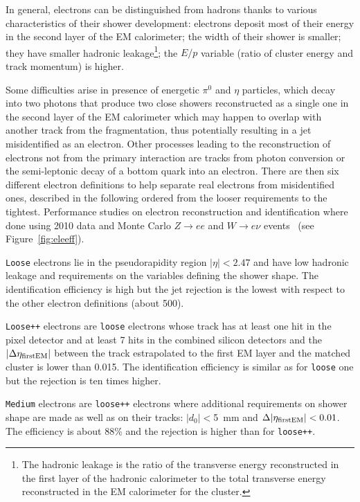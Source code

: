 In general, electrons can be distinguished from hadrons thanks to various characteristics
of their shower development: electrons deposit most of their energy in the second layer of
the EM calorimeter; the width of their shower is smaller; they have smaller
hadronic leakage\footnote{The hadronic leakage is the ratio of the transverse energy reconstructed
in the first layer of the hadronic calorimeter to the total  transverse energy reconstructed in the 
EM calorimeter for the cluster.}; the $E/p$ variable (ratio of cluster energy and track momentum) is higher.

Some difficulties arise in presence of energetic
$\pi^0$ and $\eta$ particles, 
which decay into two photons that produce two close 
showers reconstructed as a single one in the second layer of the EM
calorimeter which may happen to overlap with another track from the fragmentation, 
thus potentially resulting in a jet misidentified as an electron.
Other processes leading to the reconstruction of electrons 
not from the primary interaction are tracks from photon conversion
or the semi-leptonic decay of a bottom quark into an electron.
There are then six different electron definitions to help 
separate real electrons from misidentified ones,
described in the following ordered from the looser requirements to the tightest.
Performance studies on electron reconstruction and identification where done using 2010 data and Monte
Carlo $Z\to ee$ and $W\to e\nu$ events~\cite{eperf} (see Figure~\ref{fig:eleeff}). 

\texttt{Loose} electrons lie in the pseudorapidity region $|\eta| < 2.47$ and have 
low hadronic leakage and requirements on the variables defining the shower shape.
The identification efficiency is high but the jet rejection is the lowest
with respect to the other electron definitions (about 500).

\texttt{Loose++} electrons are \texttt{loose} electrons whose track has at least one hit in 
the pixel detector and at least 7 hits in the combined silicon detectors and the
$|\Delta\eta_{\rm first EM}|$ between the track estrapolated to the first EM layer and
the matched cluster is lower than 0.015. The identification
efficiency is similar as for \texttt{loose} one but the rejection is ten times higher.

\texttt{Medium} electrons are \texttt{loose++} electrons where additional requirements on shower shape
are made as well as on their tracks: $|d_0|<$5~mm and $\Delta|\eta_{\rm first EM}|<0.01$.
The efficiency is about 88\% and the rejection is
higher than for \texttt{loose++}.

